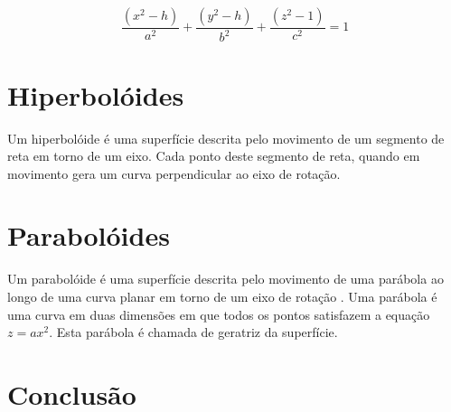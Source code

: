 \documentclass[
	article,			%
	11pt,				%
	oneside,			%
	a4paper,			%
	english,			%
	brazil,				%
	]{abntex2}
\begin{document}
			$$\frac{(x^2-h)}{a^2}+\frac{(y^2-h)}{b^2}+\frac{(z^2-1)}{c^2}=1$$

	\section{Hiperbolóides} 

		Um hiperbolóide é uma superfície descrita pelo movimento de um segmento de
		reta em torno de um eixo. Cada ponto deste segmento de reta, quando em
		movimento gera um curva perpendicular ao eixo de rotação.

	\section{Parabolóides}

		Um parabolóide é uma superfície descrita pelo movimento de uma parábola ao
		longo de uma curva planar em torno de um eixo de rotação . Uma parábola é
		uma curva em duas dimensões em que todos os pontos satisfazem a equação $z =
		ax^2$. Esta parábola é chamada de geratriz da superfície.

	\section{Conclusão}
    
	

	\nocite{boulos1997}
	\nocite{winterle2000vetores}
	
\end{document}

